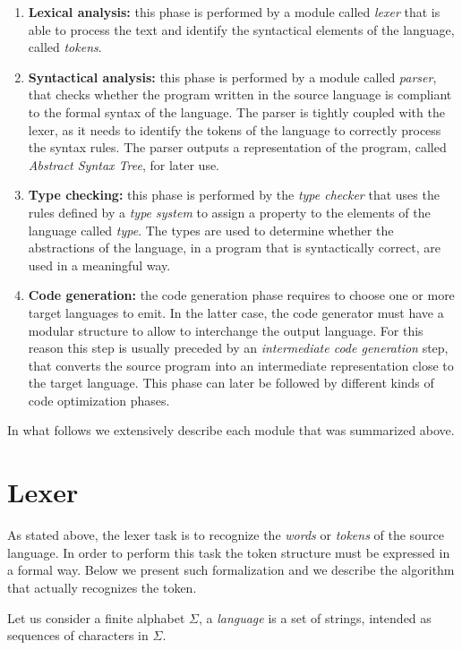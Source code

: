 \begin{enumerate}
	\item \textbf{Lexical analysis:} this phase is performed by a module called \textit{lexer} that is able to process the text and identify the syntactical elements of the language, called \textit{tokens}.
	\item \textbf{Syntactical analysis:} this phase is performed by a module called \textit{parser}, that checks whether the program written in the source language is compliant to the formal syntax of the language. The parser is tightly coupled with the lexer, as it needs to identify the tokens of the language to correctly process the syntax rules. The parser outputs a representation of the program, called \textit{Abstract Syntax Tree}, for later use.
	\item \textbf{Type checking:} this phase is performed by the \textit{type checker} that uses the rules defined by a \textit{type system} to assign a property to the elements of the language called \textit{type}. The types are used to determine whether the abstractions of the language, in a program that is syntactically correct, are used in a meaningful way.
	\item \textbf{Code generation:} the code generation phase requires to choose one or more target languages to emit. In the latter case, the code generator must have a modular structure to allow to interchange the output language. For this reason this step is usually preceded by an \textit{intermediate code generation} step, that converts the source program into an intermediate representation close to the target language. This phase can later be followed by different kinds of code optimization phases.
\end{enumerate}

In what follows we extensively describe each module that was summarized above.

\section{Lexer}
\label{sec:ch_background_compiler_lexer}
As stated above, the lexer task is to recognize the \textit{words} or \textit{tokens} of the source language. In order to perform this task the token structure must be expressed in a formal way. Below we present such formalization and we describe the algorithm that actually recognizes the token.

Let us consider a finite alphabet $\Sigma$, a \textit{language} is a set of strings, intended as sequences of characters in $\Sigma$.

